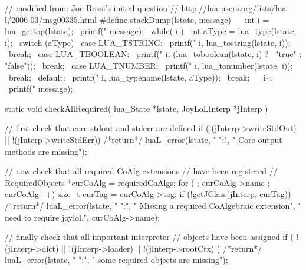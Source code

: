 \startCHeader
// modified from: Joe Rossi's initial question
// http://lua-users.org/lists/lua-l/2006-03/msg00335.html
#define stackDump(lstate, message)                \
  {                                               \
    int i = lua_gettop(lstate);                   \
    printf("%
      message);                                   \
    while( i ) {                                  \
      int aType = lua_type(lstate, i);            \
      switch (aType) {                            \
      case LUA_TSTRING:                           \
        printf("%
          i, lua_tostring(lstate, i));            \
        break;                                    \
      case LUA_TBOOLEAN:                          \
        printf("%
          i, (lua_toboolean(lstate, i) ?          \
            "true" : "false"));                   \
        break;                                    \
      case LUA_TNUMBER:                           \
        printf("%
          i, lua_tonumber(lstate, i));            \
        break;                                    \
      default:                                    \
        printf("%
          i, lua_typename(lstate, aType));        \
        break;                                    \
      }                                           \
      i--;                                        \
    }                                             \
    printf("%
      message);                                   \
  }
\stopCHeader

\startCCode
static void checkAllRequired(
  lua_State    *lstate,
  JoyLoLInterp *jInterp
) {
  // first check that core stdout and stderr are defined
  if (!(jInterp->writeStdOut) || !(jInterp->writeStdErr)) {
    /*return*/ luaL_error(lstate, "%
      "\nERROR:\n",
      "  Core output methods are missing\n");
  }
  
  // now check that all required CoAlg extensions 
  // have been registered
  //
  RequiredObjects *curCoAlg = requiredCoAlgs;
  for ( ; curCoAlg->name ; curCoAlg++) {
    size_t curTag = curCoAlg->tag;
    if (!getJClass(jInterp, curTag)) {
      /*return*/ luaL_error(lstate, "%
        "\nERROR:\n",
       "  Missing a required CoAlgebraic extension\n",
       "  need to require joylol.",
       curCoAlg->name);
    }
  }
  
  // finally check that all important interpreter 
  // objects have been assigned
  if (
    !(jInterp->dict) || 
    !(jInterp->loader) ||
    !(jInterp->rootCtx)
  ) {
      /*return*/ luaL_error(lstate, "%
        "\nERROR:\n",
        "  some required objects are missing\n\n");
  }
}

